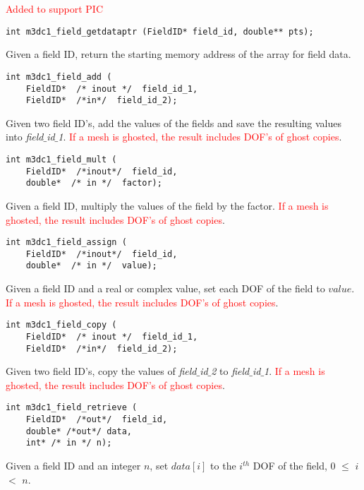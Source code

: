 \textcolor{red}{Added to support PIC}

\begin{verbatim}
int m3dc1_field_getdataptr (FieldID* field_id, double** pts);
\end{verbatim}\vspace{-.5cm}\hspace{1cm}
Given a field ID, return the starting memory address of the array for field data.

\begin{verbatim}
int m3dc1_field_add (
    FieldID*  /* inout */  field_id_1, 
    FieldID*  /*in*/  field_id_2);
\end{verbatim}\vspace{-.5cm}\hspace{1cm}
Given two field ID's, add the values of the fields and save the resulting values into \textit{field$\_$id$\_$1}. \textcolor{red}{If a mesh is ghosted, the result includes DOF's of ghost copies}.

\begin{verbatim}
int m3dc1_field_mult (
    FieldID*  /*inout*/  field_id, 
    double*  /* in */  factor);
\end{verbatim}\vspace{-.5cm}\hspace{1cm}
Given a field ID, multiply the values of the field by the factor. \textcolor{red}{If a mesh is ghosted, the result includes DOF's of ghost copies}.

\begin{verbatim}
int m3dc1_field_assign (
    FieldID*  /*inout*/  field_id, 
    double*  /* in */  value);
\end{verbatim}\vspace{-.5cm}\hspace{1cm}
Given a field ID and a real or complex value, set each DOF of the field to $value$. \textcolor{red}{If a mesh is ghosted, the result includes DOF's of ghost copies}.

\begin{verbatim}
int m3dc1_field_copy (
    FieldID*  /* inout */  field_id_1, 
    FieldID*  /*in*/  field_id_2);
\end{verbatim}\vspace{-.5cm}\hspace{1cm}
Given two field ID's, copy the values of \textit{field$\_$id$\_$2} to \textit{field$\_$id$\_$1}. \textcolor{red}{If a mesh is ghosted, the result includes DOF's of ghost copies}.

\begin{verbatim}
int m3dc1_field_retrieve (
    FieldID*  /*out*/  field_id, 
    double* /*out*/ data, 
    int* /* in */ n);
\end{verbatim}\vspace{-.5cm}\hspace{1cm}
Given a field ID and an integer $n$, set $data[i]$ to the $i^{th}$ DOF of the field, $0$ $\le$ $i$ $<$ $n$. 

